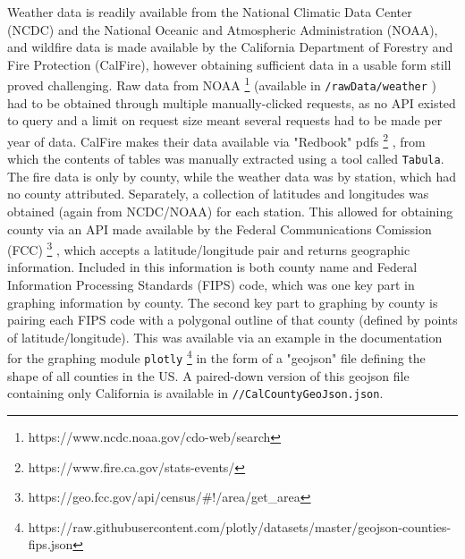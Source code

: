 \documentclass{article}
\begin{document}
Weather data is readily available from the National Climatic Data Center (NCDC) and the National Oceanic and Atmospheric Administration (NOAA), and wildfire data is made available by the California Department of Forestry and Fire Protection (CalFire), however obtaining sufficient data in a usable form still proved challenging. Raw data from NOAA
\footnote{https://www.ncdc.noaa.gov/cdo-web/search} (available in \lstinline|/rawData/weather|
) had to be obtained through multiple manually-clicked requests, as no API existed to query and a limit on request size meant several requests had to be made per year of data. CalFire makes their data available via "Redbook" pdfs
\footnote{https://www.fire.ca.gov/stats-events/}
, from which the contents of tables was manually extracted using a tool called \lstinline|Tabula|. The fire data is only by county, while the weather data was by station, which had no county attributed. Separately, a collection of latitudes and longitudes was obtained (again from NCDC/NOAA) for each station. This allowed for obtaining county via an API made available by the Federal Communications Comission (FCC)
\footnote{https://geo.fcc.gov/api/census/\#!/area/get\_area}
, which accepts a latitude/longitude pair and returns geographic information. Included in this information is both county name and Federal Information Processing Standards (FIPS) code, which was one key part in graphing information by county. The second key part to graphing by county is pairing each FIPS code with a polygonal outline of that county (defined by points of latitude/longitude). This was available via an example in the documentation for the graphing module \lstinline|plotly|
\footnote{https://raw.githubusercontent.com/plotly/datasets/master/geojson-counties-fips.json} in the form of a "geojson" file defining the shape of all counties in the US. A paired-down version of this geojson file containing only California is available in \lstinline|//CalCountyGeoJson.json|.
\end{document}
